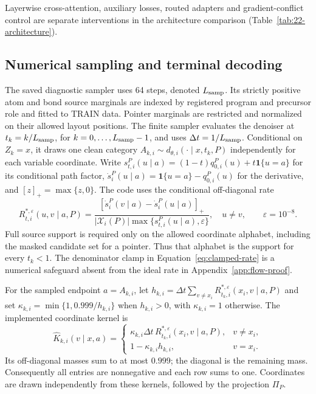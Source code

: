 Layerwise cross-attention, auxiliary losses, routed adapters and gradient-conflict control are
separate interventions in the architecture comparison (Table~\ref{tab:22-architecture}).

\subsection{Numerical sampling and terminal decoding}
\label{app:sampling}

The saved diagnostic sampler uses 64 steps, denoted $L_{\rm samp}$. Its strictly positive atom and bond
source marginals are indexed by registered program and precursor role and fitted to TRAIN data.
Pointer marginals are restricted and normalized on their allowed layout positions. The finite
sampler evaluates the denoiser at $t_k=k/L_{\rm samp}$, for
$k=0,\ldots,L_{\rm samp}-1$, and uses $\Delta t=1/L_{\rm samp}$.
Conditional on $Z_k=x$, it draws one clean category
$A_{k,i}\sim d_{\theta,i}(\cdot\mid x,t_k,P)$ independently for each variable coordinate.
Write $s_{t,i}^P(u\mid a)=(1-t)q_{0,i}^P(u)+t\mathbf1\{u=a\}$ for its conditional path factor,
$\dot s_i^P(u\mid a)=\mathbf1\{u=a\}-q_{0,i}^P(u)$ for the derivative, and
$[z]_+=\max\{z,0\}$. The code uses the conditional off-diagonal rate
\begin{equation}
 R_{t,i}^{*,\varepsilon}(u,v\mid a,P)
 =\frac{[\dot s_i^P(v\mid a)-\dot s_i^P(u\mid a)]_+}
 {|\mathcal X_i(P)|\max\{s_{t,i}^P(u\mid a),\varepsilon\}},
 \quad u\neq v,\qquad \varepsilon=10^{-8}.
 \label{eq:clamped-rate}
\end{equation}
Full source support is required only on the allowed coordinate alphabet, including the masked
candidate set for a pointer. Thus that alphabet is the support for every $t_k<1$.
The denominator clamp in Equation~\ref{eq:clamped-rate} is a numerical safeguard absent from the
ideal rate in Appendix~\ref{app:flow-proof}.

For the sampled endpoint $a=A_{k,i}$, let
$h_{k,i}=\Delta t\sum_{v\neq x_i}R_{t_k,i}^{*,\varepsilon}(x_i,v\mid a,P)$ and set
$\kappa_{k,i}=\min\{1,0.999/h_{k,i}\}$ when $h_{k,i}>0$, with $\kappa_{k,i}=1$ otherwise.
The implemented coordinate kernel is
\begin{equation}
 \widehat K_{k,i}(v\mid x,a)=
 \begin{cases}
 \kappa_{k,i}\Delta t\,R_{t_k,i}^{*,\varepsilon}(x_i,v\mid a,P),&v\neq x_i,\\
 1-\kappa_{k,i}h_{k,i},&v=x_i.
 \end{cases}
 \label{eq:capped-kernel}
\end{equation}
Its off-diagonal masses sum to at most $0.999$; the diagonal is the remaining mass. Consequently
all entries are nonnegative and each row sums to one. Coordinates are drawn independently from
these kernels, followed by the projection $\Pi_P$.

